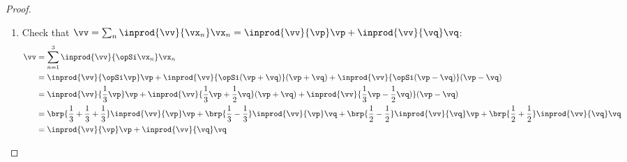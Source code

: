 \begin{proof}
\begin{enumerate}
   \item Check that $\vv=\sum_n \inprod{\vv}{\vx_n}\vx_n = \inprod{\vv}{\vp}\vp + \inprod{\vv}{\vq}\vq$:
     \begin{align*}
       \vv
         &= \sum_{n=1}^3 \inprod{\vv}{\opSi\vx_n}\vx_n
       \\&= \inprod{\vv}{\opSi\vp}\vp +\inprod{\vv}{\opSi(\vp+\vq)}(\vp+\vq) +\inprod{\vv}{\opSi(\vp-\vq)}(\vp-\vq)
       \\&= \inprod{\vv}{\frac{1}{3}\vp}\vp
            +\inprod{\vv}{\frac{1}{3}\vp+\frac{1}{2}\vq}(\vp+\vq)
            +\inprod{\vv}{\frac{1}{3}\vp-\frac{1}{2}\vq)}(\vp-\vq)
       \\&=   \brp{\frac{1}{3}+\frac{1}{3}+\frac{1}{3}}\inprod{\vv}{\vp}\vp
            + \brp{\frac{1}{3}-\frac{1}{3}}            \inprod{\vv}{\vp}\vq
            + \brp{\frac{1}{2}-\frac{1}{2}}            \inprod{\vv}{\vq}\vp
            + \brp{\frac{1}{2}+\frac{1}{2}}            \inprod{\vv}{\vq}\vq
       \\&=   \inprod{\vv}{\vp}\vp + \inprod{\vv}{\vq}\vq
     \end{align*}

\end{enumerate}
\end{proof}








